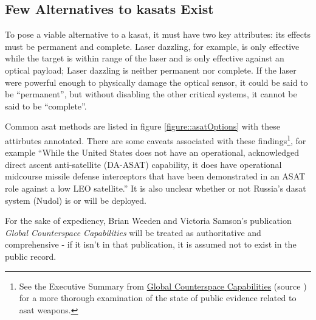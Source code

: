 \subsection{Few Alternatives to \acp{kasat} Exist}

To pose a viable alternative to a \ac{kasat}, it must have two key
attributes: its effects must be permanent and complete.  Laser
dazzling, for example, is only effective while the target is within
range of the laser and is only effective against an optical payload;
Laser dazzling is neither permanent nor complete.  If the laser were
powerful enough to physically damage the optical sensor, it could be
said to be ``permanent'', but without disabling the other critical
systems, it cannot be said to be ``complete''.

Common \ac{asat} methods are listed in figure
\ref{figure::asatOptions} with these attirbutes annotated.  There are
some caveats associated with these findings\footnote{See the Executive
Summary from
\href{https://swfound.org/media/207344/swf_global_counterspace_capabilities_2022.pdf}{Global
  Counterspace Capabilities} (source \cite{brian}) for a more thorough
examination of the state of public evidence related to \acl{asat}
weapons.}, for example ``While the United States does not have an
operational, acknowledged direct ascent anti-satellite (DA-ASAT)
capability, it does have operational midcourse missile defense
interceptors that have been demonstrated in an ASAT role against a low
LEO satellite.''\cite[pxiii]{brian} It is also unclear whether or not
Russia's \ac{dasat} system (Nudol) is or will be
deployed.\cite[pxv]{brian}

For the sake of expediency, Brian Weeden and Victoria Samson's
publication {\it Global Counterspace Capabilities}\cite{brian} will be
treated as authoritative and comprehensive - if it isn't in that
publication, it is assumed not to exist in the public record.

